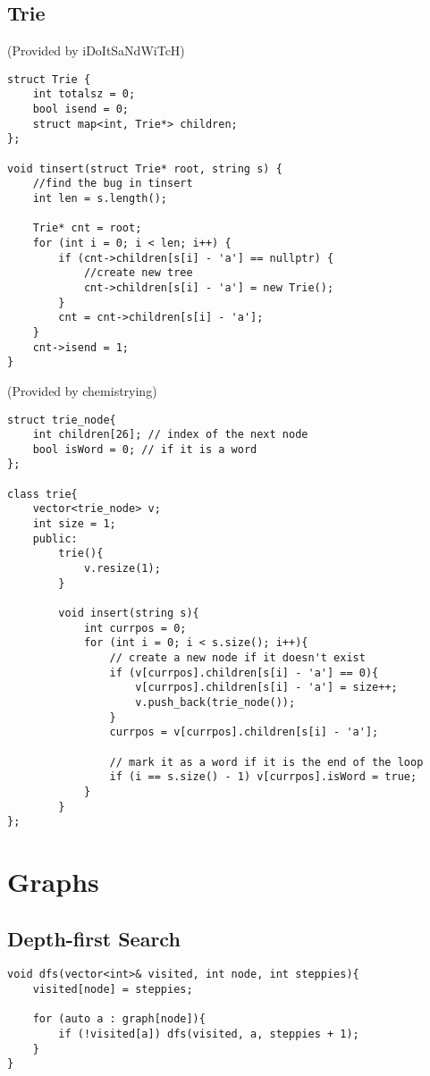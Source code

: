 \documentclass{article}
\begin{document}
\subsection{Trie}
(Provided by iDoItSaNdWiTcH)
\begin{verbatim}
struct Trie {
    int totalsz = 0;
    bool isend = 0;
    struct map<int, Trie*> children;
};
    
void tinsert(struct Trie* root, string s) {
    //find the bug in tinsert
    int len = s.length();
    
    Trie* cnt = root;
    for (int i = 0; i < len; i++) {
        if (cnt->children[s[i] - 'a'] == nullptr) {
            //create new tree
            cnt->children[s[i] - 'a'] = new Trie();
        }
        cnt = cnt->children[s[i] - 'a'];
    }
    cnt->isend = 1;
}
\end{verbatim}
(Provided by chemistrying)
\begin{verbatim}
struct trie_node{
    int children[26]; // index of the next node
    bool isWord = 0; // if it is a word
};

class trie{
    vector<trie_node> v;
    int size = 1;
    public:
        trie(){
            v.resize(1);
        }

        void insert(string s){
            int currpos = 0;
            for (int i = 0; i < s.size(); i++){
                // create a new node if it doesn't exist
                if (v[currpos].children[s[i] - 'a'] == 0){
                    v[currpos].children[s[i] - 'a'] = size++;
                    v.push_back(trie_node());
                }
                currpos = v[currpos].children[s[i] - 'a'];
                
                // mark it as a word if it is the end of the loop
                if (i == s.size() - 1) v[currpos].isWord = true;
            }
        }
};
\end{verbatim}
\pagebreak
\section{Graphs}

\subsection{Depth-first Search}
\begin{verbatim}
void dfs(vector<int>& visited, int node, int steppies){
    visited[node] = steppies;

    for (auto a : graph[node]){
        if (!visited[a]) dfs(visited, a, steppies + 1);
    }
}
\end{verbatim}
\end{document}
